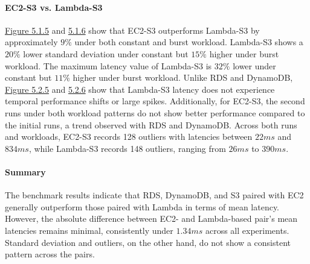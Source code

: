 \paragraph*{EC2-S3 vs. Lambda-S3}
\hyperref[fig:bar_s3_const]{Figure 5.1.5} and \hyperref[fig:bar_s3_bursty]{5.1.6} show that EC2-S3 outperforms Lambda-S3 by approximately $9\%$ under both constant and burst workload. Lambda-S3 shows a $20\%$ lower standard deviation under constant but $15\%$ higher under burst workload. The maximum latency value of Lambda-S3 is $32\%$ lower under constant but $11\%$ higher under burst workload.
%
Unlike RDS and DynamoDB, \hyperref[fig:ts_s3_const]{Figure 5.2.5} and \hyperref[fig:ts_s3_bursty]{5.2.6} show that Lambda-S3 latency does not experience temporal performance shifts or large spikes. Additionally, for EC2-S3, the second runs under both workload patterns do not show better performance compared to the initial runs, a trend observed with RDS and DynamoDB.
%
Across both runs and workloads, EC2-S3 records 128 outliers with latencies between $22ms$ and $834ms$, while Lambda-S3 records 148 outliers, ranging from $26ms$ to $390ms$.

\paragraph*{Summary}
The benchmark results indicate that RDS, DynamoDB, and S3 paired with EC2 generally outperform those paired with Lambda in terms of mean latency. However, the absolute difference between EC2- and Lambda-based pair's mean latencies remains minimal, consistently under $1.34ms$ across all experiments. Standard deviation and outliers, on the other hand, do not show a consistent pattern across the pairs. 


